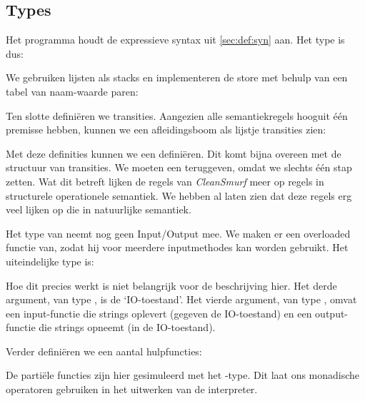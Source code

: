 \subsection{Types}
\label{sec:cleansmurf:types}
Het programma houdt de expressieve syntax uit \autoref{sec:def:syn} aan. Het
type  is dus:



We gebruiken lijsten als stacks en implementeren de store met behulp van een
tabel van naam-waarde paren:



Ten slotte definiëren we transities. Aangezien alle semantiekregels hooguit één
premisse hebben, kunnen we een afleidingsboom als lijstje transities zien:



Met deze definities kunnen we een  definiëren. Dit komt bijna overeen met de structuur van transities. We
moeten een  teruggeven, omdat we slechts één stap zetten. Wat dit
betreft lijken de regels van \emph{CleanSmurf} meer op regels in structurele
operationele semantiek. We hebben al laten zien dat deze regels erg veel lijken
op die in natuurlijke semantiek.

Het type van  neemt nog geen Input/Output mee. We maken er een
overloaded functie van, zodat hij voor meerdere inputmethodes kan worden
gebruikt. Het uiteindelijke type is:



Hoe dit precies werkt is niet belangrijk voor de beschrijving hier. Het derde
argument, van type , is de `IO-toestand'. Het vierde argument, van type
, omvat een input-functie die strings oplevert (gegeven de
IO-toestand) en een output-functie die strings opneemt (in de IO-toestand).

\medskip
Verder definiëren we een aantal hulpfuncties:



De partiële functies zijn hier gesimuleerd met het -type. Dit laat
ons monadische operatoren gebruiken in het uitwerken van de interpreter.
